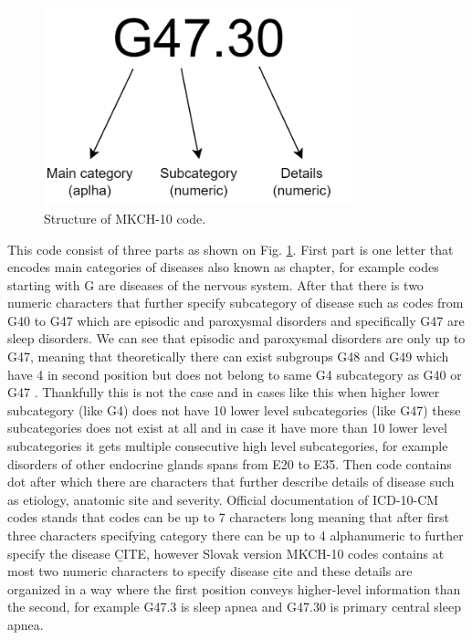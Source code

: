 \begin{figure}[!h]
	\centering
	
	\includegraphics[width=0.8\textwidth]{images/ICD-10-CM.png}
	
	\caption{Structure of MKCH-10 code.}
	\label{fig:icd-10-cm}
\end{figure}

This code consist of three parts as shown on Fig. \ref{fig:icd-10-cm}. First part is one letter that encodes main categories of diseases also known as chapter, for example codes starting with G are diseases of the nervous system. 
After that there is two numeric characters that further specify subcategory of disease such as codes from G40 to G47 which are episodic and paroxysmal disorders and specifically G47 are sleep disorders. 
We can see that episodic and paroxysmal disorders are only up to G47, meaning that theoretically there can exist subgroups G48 and G49 which have 4 in second position but does not belong to same G4 subcategory as G40 or G47 \label{mkch_subdiv}. Thankfully this is not the case and in cases like this when higher lower subcategory (like G4) does not have 10 lower level subcategories (like G47) these subcategories does not exist at all and in case it have more than 10 lower level subcategories it gets multiple consecutive high level subcategories, for example disorders of other endocrine glands spans from E20 to E35. 
Then code contains dot after which there are characters that further describe details of disease such as etiology, anatomic site and severity. Official documentation of ICD-10-CM codes stands that codes can be up to 7 characters long meaning that after first three characters specifying category there can be up to 4 alphanumeric to further specify the disease \b{CITE}, however Slovak version MKCH-10 codes contains at most two numeric characters to specify disease \b{cite} and these details are organized in a way where the first position conveys higher-level information than the second, for example G47.3 is sleep apnea and G47.30 is primary central sleep apnea.
\\

